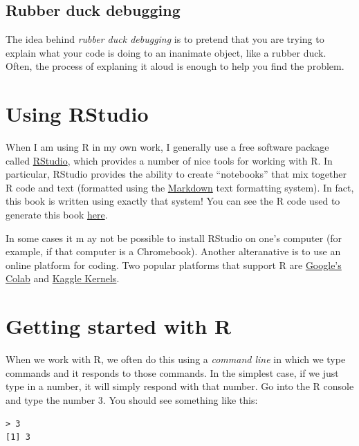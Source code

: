 \documentclass[
  12pt,
]{book}
\begin{document}
\hypertarget{rubber-duck-debugging}{%
\subsection{Rubber duck debugging}\label{rubber-duck-debugging}}

The idea behind \emph{rubber duck debugging} is to pretend that you are trying to explain what your code is doing to an inanimate object, like a rubber duck. Often, the process of explaning it aloud is enough to help you find the problem.

\hypertarget{using-rstudio}{%
\section{Using RStudio}\label{using-rstudio}}

When I am using R in my own work, I generally use a free software package called \href{https://rstudio.com/}{RStudio}, which provides a number of nice tools for working with R. In particular, RStudio provides the ability to create ``notebooks'' that mix together R code and text (formatted using the \href{https://daringfireball.net/projects/markdown/}{Markdown} text formatting system). In fact, this book is written using exactly that system! You can see the R code used to generate this book \href{https://statsthinking21.github.io/statsthinking21-R-site/}{here}.

In some cases it m ay not be possible to install RStudio on one's computer (for example, if that computer is a Chromebook). Another alteranative is to use an online platform for coding. Two popular platforms that support R are \href{https://colab.research.google.com/}{Google's Colab} and \href{https://www.kaggle.com/kernels}{Kaggle Kernels}.

\hypertarget{getting-started-with-r}{%
\section{Getting started with R}\label{getting-started-with-r}}

When we work with R, we often do this using a \emph{command line} in which we type commands and it responds to those commands. In the simplest case, if we just type in a number, it will simply respond with that number. Go into the R console and type the number 3. You should see something like this:

\begin{verbatim}
> 3
[1] 3
\end{verbatim}
\end{document}
